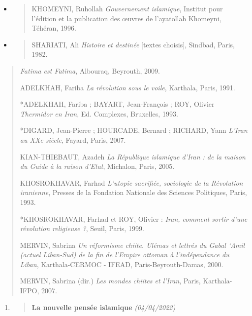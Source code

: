 \begin{itemize}
\item
  \begin{quote}
  KHOMEYNI, Ruhollah \emph{Gouvernement islamique}, Institut pour
  l'édition et la publication des œuvres de l'ayatollah Khomeyni,
  Téhéran, 1996.
  \end{quote}
\item
  \begin{quote}
  SHARIATI, Ali \emph{Histoire et destinée} {[}textes choisis{]},
  Sindbad, Paris, 1982.
  \end{quote}
\end{itemize}

\begin{quote}
\emph{Fatima est Fatima}, Albouraq, Beyrouth, 2009.

ADELKHAH, Fariba \emph{La révolution sous le voile}, Karthala, Paris,
1991.

*ADELKHAH, Fariba ; BAYART, Jean-François ; ROY, Olivier \emph{Thermidor
en Iran}, Ed. Complexes, Bruxelles, 1993.

*DIGARD, Jean-Pierre ; HOURCADE, Bernard ; RICHARD, Yann \emph{L'Iran au
XXe siècle}, Fayard, Paris, 2007.

KIAN-THIEBAUT, Azadeh \emph{La République islamique d'Iran : de la
maison du Guide à la raison d'Etat}, Michalon, Paris, 2005.

KHOSROKHAVAR, Farhad \emph{L'utopie sacrifiée, sociologie de la
Révolution iranienne}, Presses de la Fondation Nationale des Sciences
Politiques, Paris, 1993.

*KHOSROKHAVAR, Farhad et ROY, Olivier : \emph{Iran, comment sortir d'une
révolution religieuse ?}, Seuil, Paris, 1999.

MERVIN, Sabrina \emph{Un réformisme chiite. Ulémas et lettrés du Gabal
`Amil (actuel Liban-Sud) de la fin de l'Empire ottoman à l'indépendance
du Liban}, Karthala-CERMOC - IFEAD, Paris-Beyrouth-Damas, 2000.

MERVIN, Sabrina (dir.) \emph{Les mondes chiites et l'Iran}, Paris,
Karthala-IFPO, 2007.
\end{quote}

\begin{enumerate}
\def\labelenumi{\arabic{enumi}.}
\item
  \begin{quote}
  \textbf{{La nouvelle pensée islamique}} \emph{(04/04/2022)}
  \end{quote}
\end{enumerate}

